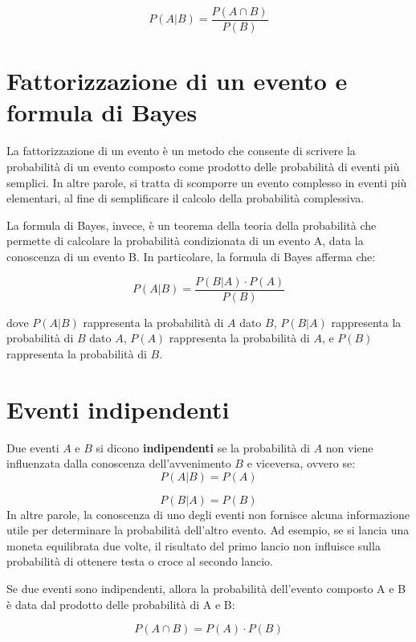 \begin{equation}
  P(A|B) = \frac{P(A \cap B)}{P(B)}
\end{equation}

\section{Fattorizzazione di un evento e formula di Bayes}

La fattorizzazione di un evento è un metodo che consente di scrivere la probabilità di un evento composto come prodotto delle probabilità di eventi più semplici. In altre parole, si tratta di scomporre un evento complesso in eventi più elementari, al fine di semplificare il calcolo della probabilità complessiva.

La formula di Bayes, invece, è un teorema della teoria della probabilità che permette di calcolare la probabilità condizionata di un evento A, data la conoscenza di un evento B. In particolare, la formula di Bayes afferma che:

\begin{equation}
  P(A|B) = \frac{P(B|A) \cdot P(A) }{ P(B)}
\end{equation}

dove $P(A|B)$ rappresenta la probabilità di $A$ dato $B$,
$P(B|A)$ rappresenta la probabilità di $B$ dato $A$,
$P(A)$ rappresenta la probabilità di $A$,
e $P(B)$ rappresenta la probabilità di $B$.


\section{Eventi indipendenti}

Due eventi $A$ e $B$ si dicono \textbf{indipendenti} se la probabilità di
$A$ non viene influenzata dalla conoscenza dell'avvenimento $B$ e viceversa,
ovvero se:
\begin{equation}
  P(A|B) = P(A)
\end{equation}

\begin{equation}
  P(B|A) = P(B)
\end{equation}
In altre parole, la conoscenza di uno degli eventi non fornisce alcuna informazione
utile per determinare la probabilità dell'altro evento.
Ad esempio, se si lancia una moneta equilibrata due volte,
il risultato del primo lancio non influisce sulla probabilità di ottenere testa o croce
al secondo lancio.

Se due eventi sono indipendenti, allora la probabilità dell'evento composto A e B è data dal prodotto delle probabilità di A e B:

\begin{equation}
  P(A \cap B) = P(A) \cdot P(B)
\end{equation}

